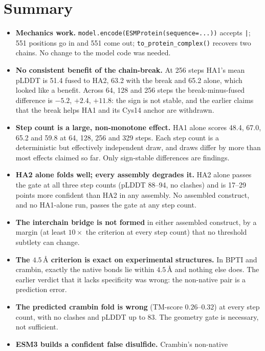 \documentclass[11pt,a4paper]{article}
\newcommand{\ang}{\,\mbox{\AA}}
\newcommand{\plddt}{pLDDT}
\begin{document}
\section{Summary}

\begin{itemize}
\item \textbf{Mechanics work.} \texttt{model.encode(ESMProtein(sequence=...))}
  accepts \texttt{|}; 551 positions go in and 551 come out;
  \texttt{to\_protein\_complex()} recovers two chains. No change to the
  model code was needed.
\item \textbf{No consistent benefit of the chain-break.} At 256 steps HA1's
  mean \plddt{} is 51.4 fused to HA2, 63.2 with the break and 65.2 alone, which
  looked like a benefit. Across 64, 128 and 256 steps the break-minus-fused
  difference is $-5.2$, $+2.4$, $+11.8$: the sign is not stable, and the
  earlier claims that the break helps HA1 and its Cys14 anchor are withdrawn.
\item \textbf{Step count is a large, non-monotone effect.} HA1 alone scores
  48.4, 67.0, 65.2 and 59.8 at 64, 128, 256 and 329 steps. Each step count is a
  deterministic but effectively independent draw, and draws differ by more
  than most effects claimed so far. Only sign-stable differences are findings.
\item \textbf{HA2 alone folds well; every assembly degrades it.} HA2 alone
  passes the gate at all three step counts (pLDDT 88--94, no clashes) and is
  17--29 points more confident than HA2 in any assembly. No assembled
  construct, and no HA1-alone run, passes the gate at any step count.
\item \textbf{The interchain bridge is not formed} in either assembled
  construct, by a margin (at least $10\times$ the criterion at every step count) that no
  threshold subtlety can change.
\item \textbf{The $4.5\ang$ criterion is exact on experimental structures.} In
  BPTI and crambin, exactly the native bonds lie within $4.5\ang$ and nothing
  else does. The earlier verdict that it lacks specificity was wrong: the
  non-native pair is a prediction error.
\item \textbf{The predicted crambin fold is wrong} (TM-score $0.26$--$0.32$) at
  every step count, with no clashes and pLDDT up to 83. The geometry gate is
  necessary, not sufficient.
\item \textbf{ESM3 builds a confident false disulfide.} Crambin's non-native

\end{itemize}
\end{document}
